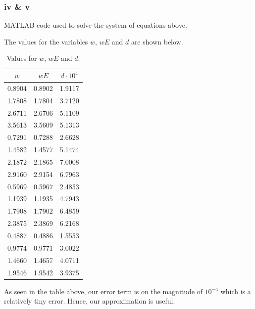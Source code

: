 \documentclass[11pt]{article}
\numberwithin{equation}{section}
\begin{document}
\subsubsection*{iv \& v}
MATLAB code used to solve the system of equations above.

The values for the variables $w$, $wE$ and $d$ are shown below.
\begin{table}[H]
\centering
\label{q2bvals}
	\begin{tabular}{||c|c|c||} 
	\hline
	$w$ & $wE$ & $d\cdot 10^{4}$\\
	\hline
	\hline
	0.8904 & 0.8902 & 1.9117\\
	1.7808 & 1.7804 & 3.7120\\
	2.6711 & 2.6706 & 5.1109\\
	3.5613 & 3.5609 & 5.1313\\
	0.7291 & 0.7288 & 2.6628\\
	1.4582 & 1.4577 & 5.1474\\
	2.1872 & 2.1865 & 7.0008\\
	2.9160 & 2.9154 & 6.7963\\
	0.5969 & 0.5967 & 2.4853\\
	1.1939 & 1.1935 & 4.7943\\
	1.7908 & 1.7902 & 6.4859\\
	2.3875 & 2.3869 & 6.2168\\
	0.4887 & 0.4886 & 1.5553\\
	0.9774 & 0.9771 & 3.0022\\
	1.4660 & 1.4657 & 4.0711\\
	1.9546 & 1.9542 & 3.9375\\
	\hline
 \end{tabular}
 \caption{Values for $w$, $wE$ and $d$.}
\end{table}
As seen in the table above, our error term is on the magnitude of $10^{-4}$ which is a relatively tiny error. Hence, our approximation is useful.
\end{document}

